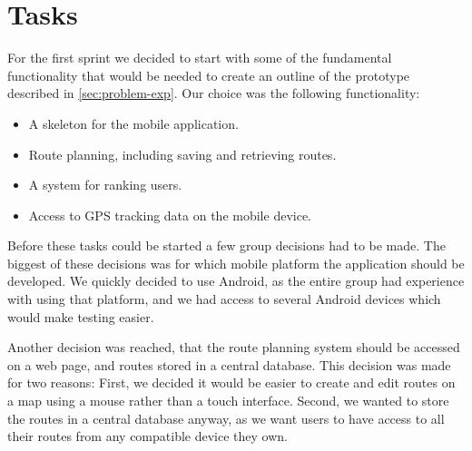 \section{Tasks}
\label{sec:sprint1-tasks}

For the first sprint we decided to start with some of the fundamental functionality that would be needed to create an outline of the prototype described in \autoref{sec:problem-exp}. Our choice was the following functionality:

\begin{itemize}
	\item{A skeleton for the mobile application.}
	\item{Route planning, including saving and retrieving routes.}
	\item{A system for ranking users.}
	\item{Access to \ac{GPS} tracking data on the mobile device.}
\end{itemize}

Before these tasks could be started a few group decisions had to be made. The biggest of these decisions was for which mobile platform the application should be developed. We quickly decided to use Android, as the entire group had experience with using that platform, and we had access to several Android devices which would make testing easier.

Another decision was reached, that the route planning system should be accessed on a web page, and routes stored in a central database. This decision was made for two reasons: First, we decided it would be easier to create and edit routes on a map using a mouse rather than a touch interface. Second, we wanted to store the routes in a central database anyway, as we want users to have access to all their routes from any compatible device they own.
